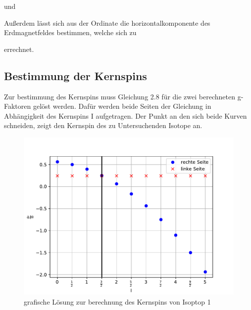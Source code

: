 

und



Außerdem lässt sich aus der Ordinate die horizontalkomponente des Erdmagnetfeldes bestimmen,
welche sich zu



errechnet.

\subsection{Bestimmung der Kernspins}
Zur bestimmung des Kernspins muss Gleichung 2.8 für die zwei berechneten g-Faktoren gelöst werden. Dafür werden beide Seiten der Gleichung in Abhängigkeit
des Kernspins I aufgetragen. Der Punkt an den sich beide Kurven schneiden, zeigt den Kernspin des zu Untersuchenden Isotope an.

\begin{figure}[h]
\centering
\includegraphics[scale=0.8]{img/coreSpin1.pdf}
\caption{grafische Lösung zur berechnung des Kernspins von Isoptop 1}
\label{LandeIso1}
\end{figure}

